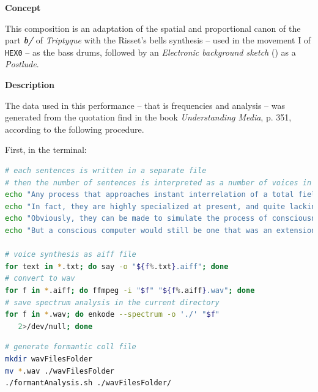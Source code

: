 \documentclass{book}
\begin{document}
\noindent \textbf{{\large Concept}}
\hrulefill

\bigskip

This composition is an adaptation of the spatial and proportional canon of  the part \textbf{\textit{b/}}
of \textsl{Triptyque} with the Risset's bells synthesis -- used in the movement I of \texttt{HEX0} -- as the bass drums, followed by an \textsl{Electronic background sketch} () as a \textit{Postlude}.

\smallskip
\bigskip

\noindent \textbf{{\large Description}}
\hrulefill

\bigskip

The data used in this performance -- that is frequencies and  \textsl{} analysis --  was generated from the quotation find in the book \textit{Understanding Media}, \citep{mm} p. 351, according to the following procedure.

\newpage

First, in the terminal:

\begin{lstlisting}[language=bash]
# each sentences is written in a separate file
# then the number of sentences is interpreted as a number of voices in order to make interesting combination done with ~OCWR and symmetric permutation
echo "Any process that approaches instant interrelation of a total field tends to raise itself to the level of conscious awareness, so that computers seem to think." > 1.txt
echo "In fact, they are highly specialized at present, and quite lacking in the full process of interrelation that makes for consciousness." > 2.txt
echo "Obviously, they can be made to simulate the process of consciousness, just as our electric global networks now begin to simulate the condition of our central nervous system." > 3.txt
echo "But a conscious computer would still be one that was an extension of our consciousness." > 4.txt

# voice synthesis as aiff file 
for text in *.txt; do say -o "${f%.txt}.aiff"; done
# convert to wav 
for f in *.aiff; do ffmpeg -i "$f" "${f%.aiff}.wav"; done
# save spectrum analysis in the current directory
for f in *.wav; do enkode --spectrum -o './' "$f" 
   2>/dev/null; done
\end{lstlisting}
\begin{lstlisting}[language=bash]
# generate formantic coll file
mkdir wavFilesFolder
mv *.wav ./wavFilesFolder
./formantAnalysis.sh ./wavFilesFolder/
\end{lstlisting}
\end{document}
